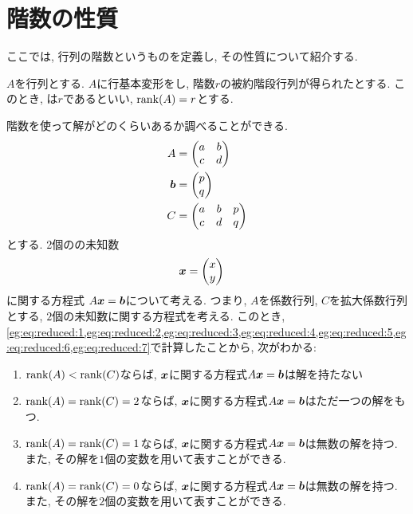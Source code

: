 \section{階数の性質}
ここでは,
行列の階数というものを定義し,
その性質について紹介する.

\begin{definition}
  \label{def:rank}
  $A$を行列とする.
  $A$に行基本変形をし,
  階数$r$の被約階段行列が得られたとする.
  このとき, 
  は$r$であるといい,
  $\operatorname{rank}(A)=r$とする.
\end{definition}
階数を使って解がどのくらいあるか調べることができる.
\begin{align*}
  A&=
  \begin{pmatrix}
    a&b\\
    c&d
  \end{pmatrix}\\
  \boldsymbol{b}&=
  \begin{pmatrix}
    p\\
    q
  \end{pmatrix}\\
  C&=
  \begin{pmatrix}
    a&b&p\\
    c&d&q
  \end{pmatrix}
\end{align*}
とする. 2個のの未知数
\begin{align*}
  \boldsymbol{x}&=
  \begin{pmatrix}
    x\\y
  \end{pmatrix}
\end{align*}
に関する方程式 $A\boldsymbol{x}=\boldsymbol{b}$について考える.
つまり, $A$を係数行列, $C$を拡大係数行列とする,
$2$個の未知数に関する方程式を考える.
このとき, \cref{eg:eq:reduced:1,eg:eq:reduced:2,eg:eq:reduced:3,eg:eq:reduced:4,eg:eq:reduced:5,eg:eq:reduced:6,eg:eq:reduced:7}で計算したことから,
次がわかる:
\begin{enumerate}
  \item $\operatorname{rank}(A)<\operatorname{rank}(C)$ならば,
  $\boldsymbol{x}$に関する方程式$A\boldsymbol{x}=\boldsymbol{b}$は解を持たない
  \item $\operatorname{rank}(A)=\operatorname{rank}(C)=2$ならば,
  $\boldsymbol{x}$に関する方程式$A\boldsymbol{x}=\boldsymbol{b}$はただ一つの解をもつ.
  \item $\operatorname{rank}(A)=\operatorname{rank}(C)=1$ならば,
    $\boldsymbol{x}$に関する方程式$A\boldsymbol{x}=\boldsymbol{b}$は無数の解を持つ.
    また, その解を$1$個の変数を用いて表すことができる.
  \item $\operatorname{rank}(A)=\operatorname{rank}(C)=0$ならば,
    $\boldsymbol{x}$に関する方程式$A\boldsymbol{x}=\boldsymbol{b}$は無数の解を持つ.
    また, その解を$2$個の変数を用いて表すことができる.
\end{enumerate}
